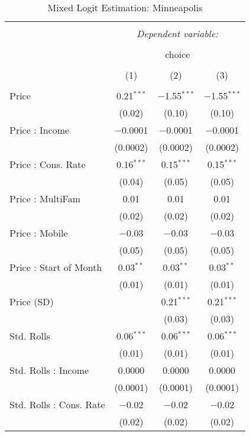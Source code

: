
\begin{table}[!htbp] \centering 
  \caption{Mixed Logit Estimation: Minneapolis} 
  \label{tab:mnlMinneapolisRandCoef} 
\begin{tabular}{@{\extracolsep{5pt}}lccc} 
\\[-1.8ex]\hline 
\hline \\[-1.8ex] 
 & \multicolumn{3}{c}{\textit{Dependent variable:}} \\ 
\cline{2-4} 
\\[-1.8ex] & \multicolumn{3}{c}{choice} \\ 
\\[-1.8ex] & (1) & (2) & (3)\\ 
\hline \\[-1.8ex] 
 Price & 0.21$^{***}$ & $-$1.55$^{***}$ & $-$1.55$^{***}$ \\ 
  & (0.02) & (0.10) & (0.10) \\ 
  Price : Income & $-$0.0001 & $-$0.0001 & $-$0.0001 \\ 
  & (0.0002) & (0.0002) & (0.0002) \\ 
  Price : Cons. Rate & 0.16$^{***}$ & 0.15$^{***}$ & 0.15$^{***}$ \\ 
  & (0.04) & (0.05) & (0.05) \\ 
  Price : MultiFam & 0.01 & 0.01 & 0.01 \\ 
  & (0.02) & (0.02) & (0.02) \\ 
  Price : Mobile & $-$0.03 & $-$0.03 & $-$0.03 \\ 
  & (0.05) & (0.05) & (0.05) \\ 
  Price : Start of Month & 0.03$^{**}$ & 0.03$^{**}$ & 0.03$^{**}$ \\ 
  & (0.01) & (0.01) & (0.01) \\ 
  Price (SD) &  & 0.21$^{***}$ & 0.21$^{***}$ \\ 
  &  & (0.03) & (0.03) \\ 
  Std. Rolls & 0.06$^{***}$ & 0.06$^{***}$ & 0.06$^{***}$ \\ 
  & (0.01) & (0.01) & (0.01) \\ 
  Std. Rolls : Income & 0.0000 & 0.0000 & 0.0000 \\ 
  & (0.0001) & (0.0001) & (0.0001) \\ 
  Std. Rolls : Cons. Rate & $-$0.02 & $-$0.02 & $-$0.02 \\ 
  & (0.02) & (0.02) & (0.02) \\ 

\end{tabular}
\end{table}
